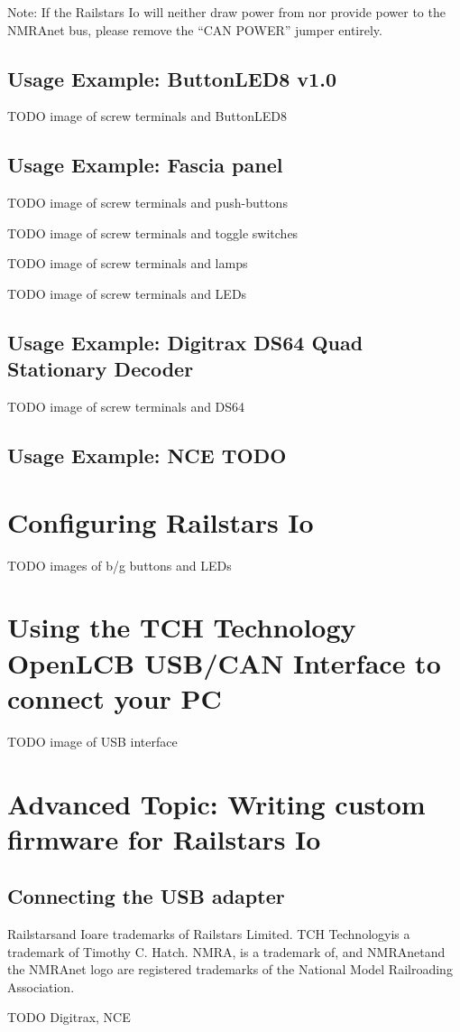 \documentclass[12pt]{book}
\begin{document}
Note: If the Railstars Io will neither draw power from nor provide power to the NMRAnet bus, please remove the ``CAN POWER'' jumper entirely.

\section{Usage Example: ButtonLED8 v1.0}

TODO image of screw terminals and ButtonLED8

\section{Usage Example: Fascia panel}

TODO image of screw terminals and push-buttons

TODO image of screw terminals and toggle switches

TODO image of screw terminals and lamps

TODO image of screw terminals and LEDs

\section{Usage Example: Digitrax DS64 Quad Stationary Decoder}

TODO image of screw terminals and DS64

\section{Usage Example: NCE TODO}

\chapter{Configuring Railstars Io}

TODO images of b/g buttons and LEDs

\chapter{Using the TCH Technology OpenLCB USB/CAN Interface to connect your PC}

TODO image of USB interface

\chapter{Advanced Topic: Writing custom firmware for Railstars Io}

\section{Connecting the USB adapter}
\label{FTDI}


\newpage
Railstars\texttrademark and Io\texttrademark are trademarks of Railstars Limited. TCH Technology\texttrademark is a trademark of Timothy C. Hatch. NMRA\texttrademark, is a trademark of, and NMRAnet\textregistered and the NMRAnet logo are registered trademarks of the National Model Railroading Association.

TODO Digitrax, NCE
\end{document}
